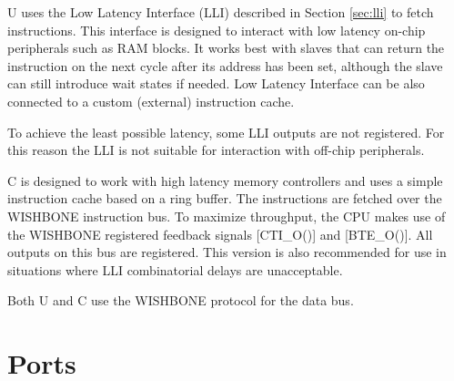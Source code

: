 \documentclass[a4paper,12pt,twoside,extrafontsizes]{memoir}
\begin{document}
\lxp{}U uses the Low Latency Interface (LLI) described in Section \ref{sec:lli} to fetch instructions. This interface is designed to interact with low latency on-chip peripherals such as RAM blocks. It works best with slaves that can return the instruction on the next cycle after its address has been set, although the slave can still introduce wait states if needed. Low Latency Interface can be also connected to a custom (external) instruction cache.

To achieve the least possible latency, some LLI outputs are not registered. For this reason the LLI is not suitable for interaction with off-chip peripherals.

\lxp{}C is designed to work with high latency memory controllers and uses a simple instruction cache based on a ring buffer. The instructions are fetched over the WISHBONE instruction bus. To maximize throughput, the CPU makes use of the WISHBONE registered feedback signals [CTI\_O()] and [BTE\_O()]. All outputs on this bus are registered. This version is also recommended for use in situations where LLI combinatorial delays are unacceptable.

Both \lxp{}U and \lxp{}C use the WISHBONE protocol for the data bus.

\section{Ports}
\end{document}
